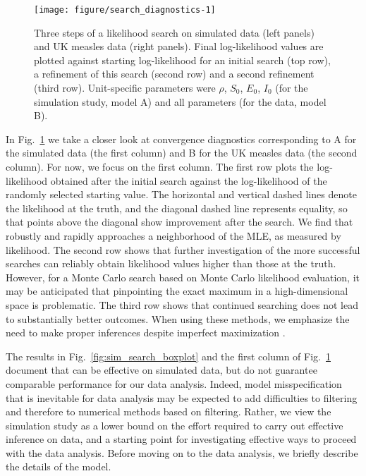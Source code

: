 \documentclass[12pt]{article}\usepackage[]{graphicx}\usepackage[]{xcolor}
\newenvironment{knitrout}{}{} %
\begin{document}
\begin{knitrout}
\color{fgcolor}\begin{figure}

\texttt{[image: figure/search\_diagnostics-1]} \hfill{}

\caption[Three steps of a likelihood search on simulated data (left panels) and UK measles data (right panels)]{Three steps of a likelihood search on simulated data (left panels) and UK measles data (right panels). Final log-likelihood values are plotted against starting log-likelihood for an initial search (top row), a refinement of this search (second row) and a second refinement (third row). Unit-specific parameters were $\rho$, $S_0$, $E_0$, $I_0$ (for the simulation study, model A) and all parameters (for the data, model B).}\label{fig:search_diagnostics}
\end{figure}

\end{knitrout}


In Fig.~\ref{fig:search_diagnostics} we take a closer look at convergence diagnostics corresponding to A for the simulated data (the first column) and B for the UK measles data (the second column).
For now, we focus on the first column.
The first row plots the log-likelihood obtained after the initial search against the log-likelihood of the randomly selected starting value.
The horizontal and vertical dashed lines denote the likelihood at the truth, and the diagonal dashed line represents equality, so that points above the diagonal show improvement after the search.
We find that {\ibpf} robustly and rapidly approaches a neighborhood of the MLE, as measured by likelihood.
The second row shows that further investigation of the more successful searches can reliably obtain likelihood values higher than those at the truth.
However, for a Monte Carlo search based on Monte Carlo likelihood evaluation, it may be anticipated that pinpointing the exact maximum in a high-dimensional space is problematic.
The third row shows that continued searching does not lead to substantially better outcomes.
When using these methods, we emphasize the need to make proper inferences despite imperfect maximization \citep{ionides17,ning21}.


The results in Fig.~\ref{fig:sim_search_boxplot} and the first column of  Fig.~\ref{fig:search_diagnostics} document that {\ibpf} can be effective on simulated data, but do not guarantee comparable performance for our data analysis.
Indeed, model misspecification that is inevitable for data analysis may be expected to add difficulties to filtering and therefore to numerical methods based on filtering.
Rather, we view the simulation study as a lower bound on the effort required to carry out effective inference on data, and a starting point for investigating effective ways to proceed with the data analysis. Before moving on to the data analysis, we briefly describe the details of the model.
\end{document}
